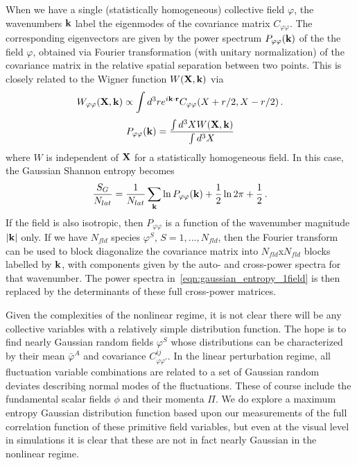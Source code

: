 \documentclass[11pt,a4paper]{article}
\begin{document}
When we have a single (statistically homogeneous) collective field $\varphi$, the wavenumbers ${\bf k}$ label the eigenmodes of the covariance matrix $C_{\varphi\varphi}$.
The corresponding eigenvectors are given by the power spectrum $P_{\varphi\varphi}({\bf k})$ of the the field $\varphi$, obtained via Fourier transformation (with unitary normalization) of the covariance matrix in the relative spatial separation between two points.
This is closely related to the Wigner function $W({\bf X},{\bf k})$ via
\begin{equation}
  W_{\varphi\varphi}({\bf X},{\bf k}) \propto \int d^3r e^{i{\bf k}\cdot{\bf r}} C_{\varphi\varphi}(X+r/2,X-r/2) \, .
\end{equation}
\begin{equation}
  P_{\varphi\varphi}({\bf k}) = \frac{\int d^3X W({\bf X},{\bf k})}{\int d^3X}
\end{equation}
where $W$ is independent of ${\bf X}$ for a statistically homogeneous field.
In this case, the Gaussian Shannon entropy becomes
\begin{equation}
  \frac{S_{G}}{N_{lat}} = \frac{1}{N_{lat}}\sum_{\bf k}\ln P_{\varphi\varphi}({\bf k}) + \frac{1}{2}\ln 2\pi + \frac{1}{2} \, .
  \label{eqn:gaussian_entropy_1field}
\end{equation}
If the field is also isotropic, then $P_{\varphi\varphi}$ is a function of the wavenumber magnitude $|{\bf k}|$ only.
If we have $N_{fld}$ species $\varphi^S$, $S=1,...,N_{fld}$, then the Fourier transform can be used to block diagonalize the covariance matrix into $N_{fld}$x$N_{fld}$ blocks labelled by ${\bf k}$, with components given by the auto- and cross-power spectra for that wavenumber.
The power spectra in~\eqref{eqn:gaussian_entropy_1field} is then replaced by the determinants of these full cross-power matrices.

Given the complexities of the nonlinear regime, it is not clear there will be any collective variables with a relatively simple distribution function. 
The hope is to find nearly Gaussian random fields 
$\varphi^S$ %
whose distributions can be characterized by their mean 
$\bar{\varphi}^A$ %
and covariance $C_{\varphi\varphi'}^{ij}$. %
In the linear perturbation regime, all fluctuation variable combinations are related to a set of Gaussian random deviates describing normal modes of the fluctuations. 
These of course include the fundamental scalar fields $\phi$ and their momenta $\Pi$. 
We do explore a maximum entropy Gaussian distribution function based upon our measurements of the full correlation function of these primitive field variables, but even at the visual level in simulations it is clear that these are not in fact nearly Gaussian in the nonlinear regime. 
\end{document}
